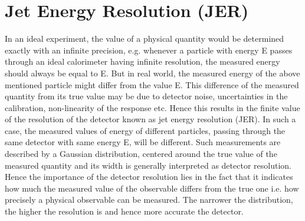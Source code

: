 \section{Jet Energy Resolution (JER)}
\label{sec:Resolution}
In an ideal experiment, the value of a physical quantity would be determined exactly with an infinite precision, e.g. whenever a particle with energy E passes through an ideal calorimeter having infinite resolution, the measured energy should always be equal to E. But in real world, the measured energy of the above mentioned particle might differ from the value E. This difference of the measured quantity from its true value may be due to detector noise, uncertainties in the calibration, non-linearity of the response etc. Hence this results in the finite value of the resolution of the detector known as jet energy resolution (JER). In such a case, the measured values of energy of different particles, passing through the same detector with same energy E, will be different. Such measurements are described by a Gaussian distribution, centered around the true value of the measured quantity and its width is generally interpreted as detector resolution. Hence the importance of the detector resolution lies in the fact that it indicates how much the measured value of the observable differs from the true one i.e. how precisely a physical observable can be measured. The narrower the distribution, the higher the resolution is and hence more accurate the detector. %

